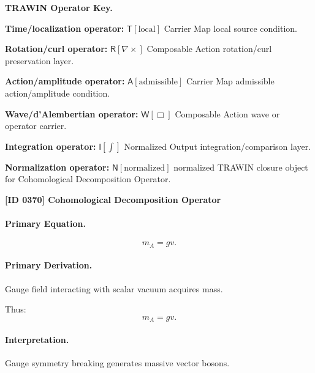 \par\vspace{0.45\baselineskip}
\noindent\begin{minipage}[t]{\linewidth}
\begingroup
\small
\raggedright
\textbf{TRAWIN Operator Key.}\par
\noindent\textbf{Time/localization operator:} $\mathsf{T}\!\left[\mathrm{local}\right]$ Carrier Map local source condition.\par
\noindent\textbf{Rotation/curl operator:} $\mathsf{R}\!\left[\nabla\times\right]$ Composable Action rotation/curl preservation layer.\par
\noindent\textbf{Action/amplitude operator:} $\mathsf{A}\!\left[\mathrm{admissible}\right]$ Carrier Map admissible action/amplitude condition.\par
\noindent\textbf{Wave/d'Alembertian operator:} $\mathsf{W}\!\left[\Box\right]$ Composable Action wave or operator carrier.\par
\noindent\textbf{Integration operator:} $\mathsf{I}\!\left[\int\right]$ Normalized Output integration/comparison layer.\par
\noindent\textbf{Normalization operator:} $\mathsf{N}\!\left[\mathrm{normalized}\right]$ normalized TRAWIN closure object for Cohomological Decomposition Operator.\par
\endgroup
\end{minipage}

\clearpage
\noindent\textbf{[ID 0370] Cohomological Decomposition Operator}\par
\vspace{0.35em}
\paragraph{Primary Equation.}
\begin{equation}
m_A = gv.
\end{equation}

\paragraph{Primary Derivation.}
Gauge field interacting with scalar vacuum acquires mass.

Thus:
\begin{equation}
\boxed{
m_A = gv.
}
\end{equation}

\paragraph{Interpretation.}
Gauge symmetry breaking generates massive vector bosons.

